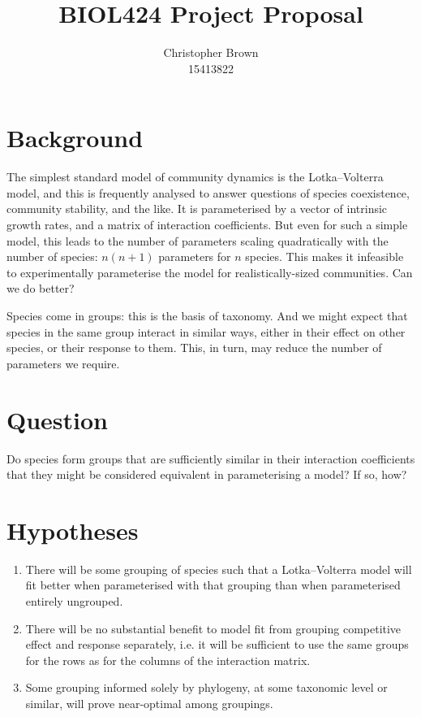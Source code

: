 \documentclass[a4paper,11pt]{article}
\title{BIOL424 Project Proposal}
\author{
	Christopher Brown\\15413822
}
\date{}
\begin{document}
\maketitle

\section{Background}

The simplest standard model of community dynamics is the Lotka--Volterra model, and this is frequently analysed to answer questions of species coexistence, community stability, and the like.
It is parameterised by a vector of intrinsic growth rates, and a matrix of interaction coefficients.
But even for such a simple model, this leads to the number of parameters scaling quadratically with the number of species: $n(n+1)$ parameters for $n$ species.
This makes it infeasible to experimentally parameterise the model for realistically-sized communities.
Can we do better?

Species come in groups: this is the basis of taxonomy.
And we might expect that species in the same group interact in similar ways, either in their effect on other species, or their response to them.
This, in turn, may reduce the number of parameters we require.

\section{Question}

Do species form groups that are sufficiently similar in their interaction coefficients that they might be considered equivalent in parameterising a model?
If so, how?

\section{Hypotheses}

\begin{enumerate}
	\item There will be some grouping of species such that a Lotka--Volterra model will fit better when parameterised with that grouping than when parameterised entirely ungrouped.
	\item There will be no substantial benefit to model fit from grouping competitive effect and response separately, i.e. it will be sufficient to use the same groups for the rows as for the columns of the interaction matrix.
	\item Some grouping informed solely by phylogeny, at some taxonomic level or similar, will prove near-optimal among groupings.
\end{enumerate}
\end{document}
